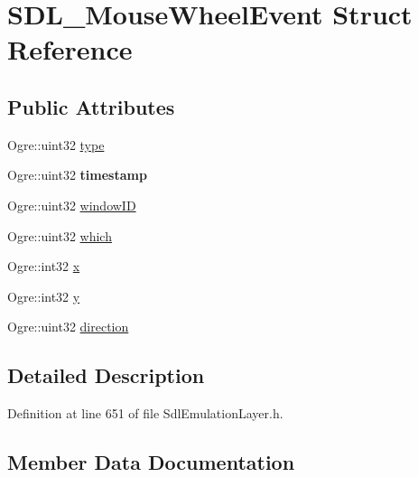 \hypertarget{struct_s_d_l___mouse_wheel_event}{}\section{S\+D\+L\+\_\+\+Mouse\+Wheel\+Event Struct Reference}
\label{struct_s_d_l___mouse_wheel_event}
\subsection*{Public Attributes}
\begin{DoxyCompactItemize}
\item 
Ogre\+::uint32 \hyperlink{struct_s_d_l___mouse_wheel_event_af95b38618d3b8f1b22e6e0f600f02a39}{type}
\item 
\mbox{\label{struct_s_d_l___mouse_wheel_event_ac31470acee60100e7df5ad4e16134f44}} 
Ogre\+::uint32 {\bfseries timestamp}
\item 
Ogre\+::uint32 \hyperlink{struct_s_d_l___mouse_wheel_event_a80feacc82c79a2372dd1b6efd6003f65}{window\+ID}
\item 
Ogre\+::uint32 \hyperlink{struct_s_d_l___mouse_wheel_event_a34a577db46da6faff1cb26a1ee4ef5fb}{which}
\item 
Ogre\+::int32 \hyperlink{struct_s_d_l___mouse_wheel_event_aeeed8bd6eaf755b8070af04f6fae690a}{x}
\item 
Ogre\+::int32 \hyperlink{struct_s_d_l___mouse_wheel_event_a7907297ede875bc78f9cf38f51f22b72}{y}
\item 
Ogre\+::uint32 \hyperlink{struct_s_d_l___mouse_wheel_event_a32c2542711cc174c519169cb0557a78a}{direction}
\end{DoxyCompactItemize}


\subsection{Detailed Description}


Definition at line 651 of file Sdl\+Emulation\+Layer.\+h.



\subsection{Member Data Documentation}
\mbox{\label{struct_s_d_l___mouse_wheel_event_a32c2542711cc174c519169cb0557a78a}} 
